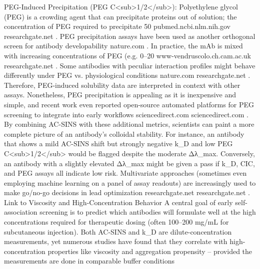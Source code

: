 PEG-Induced Precipitation (PEG C<sub>1/2</sub>): Polyethylene glycol (PEG) is a crowding agent that can precipitate proteins out of solution; the concentration of PEG required to precipitate 50%
pubmed.ncbi.nlm.nih.gov
researchgate.net
. PEG precipitation assays have been used as another orthogonal screen for antibody developability
nature.com
. In practice, the mAb is mixed with increasing concentrations of PEG (e.g. 0–20%
www-vendruscolo.ch.cam.ac.uk
researchgate.net
. Some antibodies with peculiar interaction profiles might behave differently under PEG vs. physiological conditions
nature.com
researchgate.net
. Therefore, PEG-induced solubility data are interpreted in context with other assays. Nonetheless, PEG precipitation is appealing as it is inexpensive and simple, and recent work even reported open-source automated platforms for PEG screening to integrate into early workflows
sciencedirect.com
sciencedirect.com
.
By combining AC-SINS with these additional metrics, scientists can paint a more complete picture of an antibody’s colloidal stability. For instance, an antibody that shows a mild AC-SINS shift but strongly negative k_D and low PEG C<sub>1/2</sub> would be flagged despite the moderate Δλ_max. Conversely, an antibody with a slightly elevated Δλ_max might be given a pass if k_D, CIC, and PEG assays all indicate low risk. Multivariate approaches (sometimes even employing machine learning on a panel of assay readouts) are increasingly used to make go/no-go decisions in lead optimization
researchgate.net
researchgate.net
.
Link to Viscosity and High-Concentration Behavior
A central goal of early self-association screening is to predict which antibodies will formulate well at the high concentrations required for therapeutic dosing (often 100–200 mg/mL for subcutaneous injection). Both AC-SINS and k_D are dilute-concentration measurements, yet numerous studies have found that they correlate with high-concentration properties like viscosity and aggregation propensity – provided the measurements are done in comparable buffer conditions
